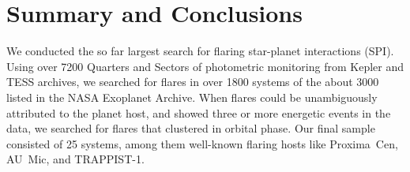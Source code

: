 \documentclass[twocolumn]{aastex631}
\begin{document}


\section{Summary and Conclusions}
\label{sec:summary}

We conducted the so far largest search for flaring star-planet interactions (SPI). Using over 7200 Quarters and Sectors of photometric monitoring from Kepler and TESS archives, we searched for flares in over 1800 systems of the about 3000 listed in the NASA Exoplanet Archive. When flares could be unambiguously attributed to the planet host, and showed three or more energetic events in the data, we searched for flares that clustered in orbital phase. Our final sample consisted of 25 systems, among them well-known flaring hosts like Proxima~Cen, AU~Mic, and TRAPPIST-1. 
\end{document}
